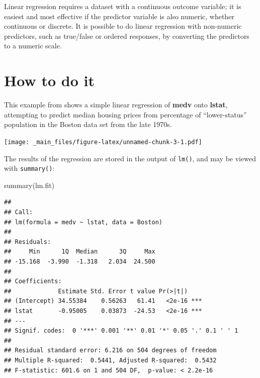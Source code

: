 \documentclass[
]{book}
\newenvironment{Shaded}{\begin{snugshade}}{\end{snugshade}}
\newcommand{\AttributeTok}[1]{\textcolor[rgb]{0.77,0.63,0.00}{#1}}
\newcommand{\DecValTok}[1]{\textcolor[rgb]{0.00,0.00,0.81}{#1}}
\newcommand{\FunctionTok}[1]{\textcolor[rgb]{0.00,0.00,0.00}{#1}}
\newcommand{\NormalTok}[1]{#1}
\newcommand{\OtherTok}[1]{\textcolor[rgb]{0.56,0.35,0.01}{#1}}
\newcommand{\SpecialCharTok}[1]{\textcolor[rgb]{0.00,0.00,0.00}{#1}}
\newcommand{\StringTok}[1]{\textcolor[rgb]{0.31,0.60,0.02}{#1}}
\begin{document}
Linear regression requires a dataset with a continuous outcome variable; it is easiest and most effective if the predictor variable is also numeric, whether continuous or discrete. It is possible to do linear regression with non-numeric predictors, such as true/false or ordered responses, by converting the predictors to a numeric scale.

\hypertarget{how-to-do-it}{%
\section{How to do it}\label{how-to-do-it}}

This example from \citet{ISLR} shows a simple linear regression of \textbf{medv} onto \textbf{lstat}, attempting to predict median housing prices from percentage of ``lower-status'' population in the Boston data set from the late 1970s.

\begin{Shaded}
\end{Shaded}

\texttt{[image: \_main\_files/figure-latex/unnamed-chunk-3-1.pdf]}

The results of the regression are stored in the output of \texttt{lm()}, and may be viewed with \texttt{summary()}:

\begin{Shaded}
\begin{Highlighting}[]
\FunctionTok{summary}\NormalTok{(lm.fit)}
\end{Highlighting}
\end{Shaded}

\begin{verbatim}
## 
## Call:
## lm(formula = medv ~ lstat, data = Boston)
## 
## Residuals:
##     Min      1Q  Median      3Q     Max 
## -15.168  -3.990  -1.318   2.034  24.500 
## 
## Coefficients:
##             Estimate Std. Error t value Pr(>|t|)    
## (Intercept) 34.55384    0.56263   61.41   <2e-16 ***
## lstat       -0.95005    0.03873  -24.53   <2e-16 ***
## ---
## Signif. codes:  0 '***' 0.001 '**' 0.01 '*' 0.05 '.' 0.1 ' ' 1
## 
## Residual standard error: 6.216 on 504 degrees of freedom
## Multiple R-squared:  0.5441, Adjusted R-squared:  0.5432 
## F-statistic: 601.6 on 1 and 504 DF,  p-value: < 2.2e-16
\end{verbatim}
\end{document}
